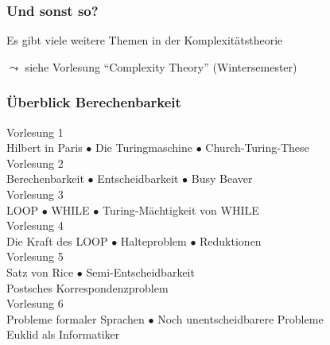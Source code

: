 \documentclass[onlymath]{beamer}
\begin{document}
\begin{frame}\frametitle{Und sonst so?}

Es gibt viele weitere Themen in der Komplexitätstheorie
\bigskip

$\leadsto$ siehe Vorlesung "`Complexity Theory"' (Wintersemester)

\end{frame}



\begin{frame}\frametitle{Überblick Berechenbarkeit}

\begin{center}
\alert{Vorlesung 1}\\
Hilbert in Paris $\bullet$ Die Turingmaschine $\bullet$ Church-Turing-These\\[1ex]
\alert{Vorlesung 2}\\
Berechenbarkeit $\bullet$ Entscheidbarkeit $\bullet$ Busy Beaver \\[1ex]
\alert{Vorlesung 3}\\LOOP $\bullet$ WHILE $\bullet$ Turing-Mächtigkeit von WHILE \\[1ex]
\alert{Vorlesung 4}\\Die Kraft des LOOP $\bullet$ Halteproblem $\bullet$ Reduktionen \\[1ex]
\alert{Vorlesung 5}\\Satz von Rice $\bullet$ Semi-Entscheidbarkeit\\ Postsches Korrespondenzproblem \\[1ex]
\alert{Vorlesung 6}\\Probleme formaler Sprachen $\bullet$ Noch unentscheidbarere Probleme\\ Euklid als Informatiker
\end{center}

\end{frame}
\end{document}
